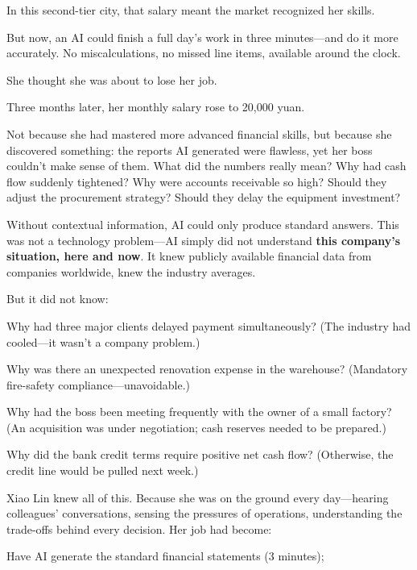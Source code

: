 In this second-tier city, that salary meant the market recognized her skills.

But now, an AI could finish a full day's work in three minutes---and do it more accurately. No miscalculations, no missed line items, available around the clock.

She thought she was about to lose her job.

\vspace{1em}

Three months later, her monthly salary rose to 20,000 yuan.

Not because she had mastered more advanced financial skills, but because she discovered something: the reports AI generated were flawless, yet her boss couldn't make sense of them.
What did the numbers really mean? Why had cash flow suddenly tightened? Why were accounts receivable so high? Should they adjust the procurement strategy? Should they delay the equipment investment?

\vspace{1em}

Without contextual information, AI could only produce standard answers.
This was not a technology problem---AI simply did not understand \textbf{this company's situation, here and now}.
It knew publicly available financial data from companies worldwide, knew the industry averages.

But it did not know:

{\kaiti Why had three major clients delayed payment simultaneously? (The industry had cooled---it wasn't a company problem.)}

{\kaiti Why was there an unexpected renovation expense in the warehouse? (Mandatory fire-safety compliance---unavoidable.)}

{\kaiti Why had the boss been meeting frequently with the owner of a small factory? (An acquisition was under negotiation; cash reserves needed to be prepared.)}

{\kaiti Why did the bank credit terms require positive net cash flow? (Otherwise, the credit line would be pulled next week.)}

\vspace{1em}

Xiao Lin knew all of this. Because she was on the ground every day---hearing colleagues' conversations, sensing the pressures of operations, understanding the trade-offs behind every decision.
Her job had become:

{\kaiti Have AI generate the standard financial statements (3 minutes);}

